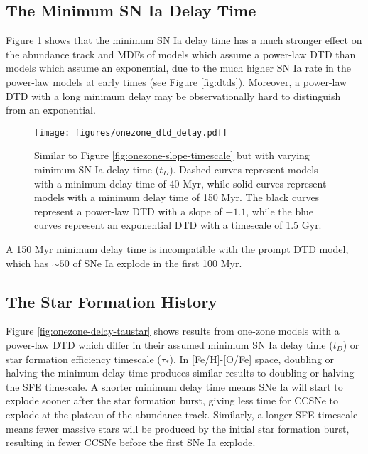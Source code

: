 \documentclass[twocolumn,linenumbers,twocolappendix]{aastex631}
\begin{document}
\subsection{The Minimum SN Ia Delay Time}

Figure \ref{fig:onezone-dtd-delay} shows that the minimum SN Ia delay time has a much stronger effect on the abundance track and MDFs of models which assume a power-law DTD than models which assume an exponential, due to the much higher SN Ia rate in the power-law models at early times (see Figure \ref{fig:dtds}). Moreover, a power-law DTD with a long minimum delay may be observationally hard to distinguish from an exponential. 

\begin{figure}
    \centering
    \texttt{[image: figures/onezone\_dtd\_delay.pdf]}
    \caption{Similar to Figure \ref{fig:onezone-slope-timescale} but with varying minimum SN Ia delay time ($t_D$). Dashed curves represent models with a minimum delay time of 40 Myr, while solid curves represent models with a minimum delay time of 150 Myr. The black curves represent a power-law DTD with a slope of $-1.1$, while the blue curves represent an exponential DTD with a timescale of 1.5 Gyr.}
    \label{fig:onezone-dtd-delay}
\end{figure}

A 150 Myr minimum delay time is incompatible with the prompt DTD model, which has $\sim 50$ of SNe Ia explode in the first 100 Myr.

\subsection{The Star Formation History}

Figure \ref{fig:onezone-delay-taustar} shows results from one-zone models with a power-law DTD which differ in their assumed minimum SN Ia delay time ($t_D$) or star formation efficiency timescale ($\tau_*$). In [Fe/H]-[O/Fe] space, doubling or halving the minimum delay time produces similar results to doubling or halving the SFE timescale. A shorter minimum delay time means SNe Ia will start to explode sooner after the star formation burst, giving less time for CCSNe to explode at the plateau of the abundance track. Similarly, a longer SFE timescale means fewer massive stars will be produced by the initial star formation burst, resulting in fewer CCSNe before the first SNe Ia explode. 
\end{document}
